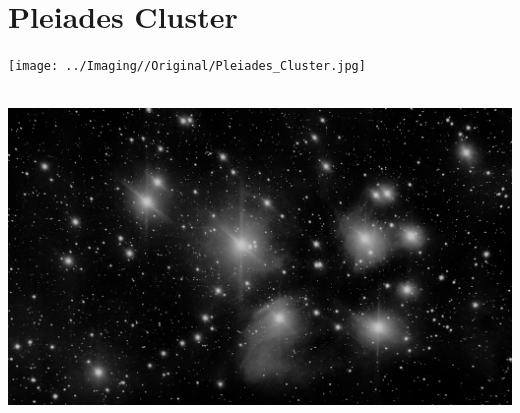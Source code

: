 \ \\\section{Pleiades Cluster}
\texttt{[image: ../Imaging//Original/Pleiades\_Cluster.jpg]}
{\footnotesize\color{white}


}\ \\
\includegraphics[width=\textwidth]{../Imaging//Grayscale/Pleiades_Cluster.jpg}
